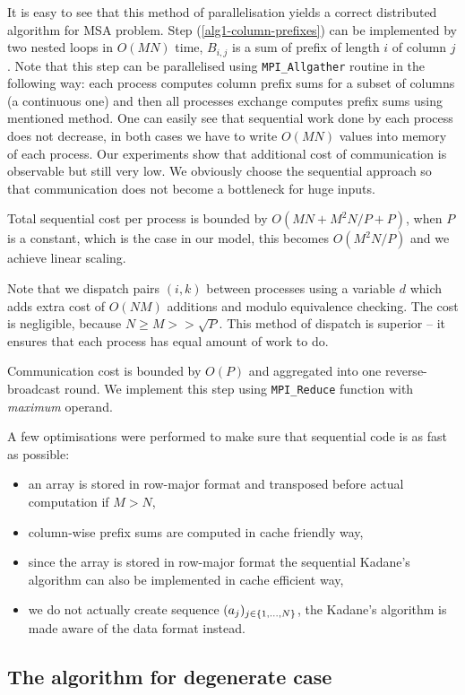 It is easy to see that this method of parallelisation yields a correct distributed algorithm for MSA problem.
Step (\ref{alg1-column-prefixes}) can be implemented by two nested loops in $O(MN)$ time, $B_{i, j}$ is a sum of prefix of length $i$ of column $j$.
Note that this step can be parallelised using \verb+MPI_Allgather+ routine in the following way: each process computes column prefix sums for a subset of columns (a continuous one) and then all processes exchange computes prefix sums using mentioned method.
One can easily see that sequential work done by each process does not decrease, in both cases we have to write $O(MN)$ values into memory of each process.
Our experiments show that additional cost of communication is observable but still very low.
We obviously choose the sequential approach so that communication does not become a bottleneck for huge inputs.

Total sequential cost per process is bounded by $O(MN + M^2N / P + P)$, when $P$ is a constant, which is the case in our model, this becomes $O(M^2N / P)$ and we achieve linear scaling.

Note that we dispatch pairs $(i, k)$ between processes using a variable $d$ which adds extra cost of $O(NM)$ additions and modulo equivalence checking.
The cost is negligible, because $N \geq M >> \sqrt{P}$.
This method of dispatch is superior -- it ensures that each process has equal amount of work to do.

Communication cost is bounded by $O(P)$ and aggregated into one reverse-broadcast round.
We implement this step using \verb+MPI_Reduce+ function with \emph{maximum} operand.

A few optimisations were performed to make sure that sequential code is as fast as possible:
\begin{itemize}
    \item an array is stored in row-major format and transposed before actual computation if $M > N$,
    \item column-wise prefix sums are computed in cache friendly way,
    \item since the array is stored in row-major format the sequential Kadane's algorithm can also be implemented in cache efficient way,
    \item we do not actually create sequence $(a_j)_{j \in \{ 1, \dots, N \}}$, the Kadane's algorithm is made aware of the data format instead.
\end{itemize}

\subsection*{The algorithm for degenerate case}

